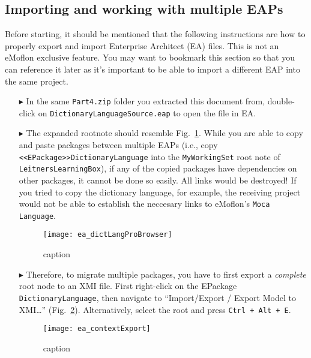 \newpage
\subsection{Importing and working with multiple EAPs}
\visHeader
\label{sec:multiEAP}

Before starting, it should be mentioned that the following instructions are how to properly export and import Enterprise Architect (EA) files. This is not an
eMoflon exclusive feature. You may want to bookmark this section so that you can reference it later as it's important to be able to import a different EAP into
the same project.

\begin{itemize}

\item[$\blacktriangleright$] In the same \texttt{Part4.zip} folder you extracted this document from, double-click on \texttt{DictionaryLanguageSource.eap} to
open the file in EA.

\item[$\blacktriangleright$] The expanded rootnote should resemble Fig.~\ref{fig:dictionaryLangStart}. While you are able to copy and paste packages between
multiple EAPs (i.e., copy \texttt{<<EPack\-age>>DictionaryLanguage} into the \texttt{MyWorkingSet} root note of \texttt{Leit\-nersLearningBox}), if any of the
copied packages have dependencies on other packages, it cannot be done so easily. All links would be destroyed! If you tried to copy the dictionary language,
for example, the receiving project would not be able to establish the neccesary links to eMoflon's \texttt{Moca Language}.

\begin{figure}[htbp]
\begin{center}
  \texttt{[image: ea\_dictLangProBrowser]}
  \caption{caption}
  \label{fig:dictionaryLangStart}
\end{center}
\end{figure}

\item[$\blacktriangleright$] Therefore, to migrate multiple packages, you have to first export a \emph{complete} root node to an XMI file. First right-click on
the EPackage \texttt{DictionaryLanguage}, then navigate to ``Import/Export / Export Model to XMI\ldots'' (Fig.~\ref{fig:contextExport}). Alternatively, select
the root and press \texttt{Ctrl + Alt + E}.

\begin{figure}[htbp]
\begin{center}
  \texttt{[image: ea\_contextExport]}
  \caption{caption}
  \label{fig:contextExport}
\end{center}
\end{figure}


\end{itemize}

